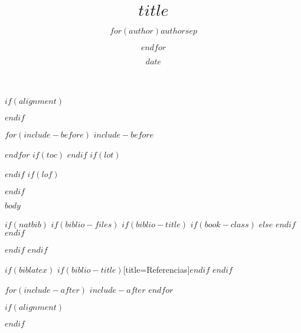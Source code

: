 \documentclass[letterpaper, 12pt, spanish, twoside]{book}
\title{$title$}
\author{$for(author)$$author$$sep$ \and $endfor$}
\date{$date$}
\begin{document}

  $if(alignment)$
  \begin{$alignment$}
  $endif$

  $for(include-before)$
  $include-before$

  $endfor$
  $if(toc)$
  {
  \hypersetup{linkcolor=black}
  \setcounter{tocdepth}{$toc-depth$}
  \tableofcontents
  }
  $endif$
  $if(lot)$
  \listoftables
  $endif$
  $if(lof)$
  \listoffigures
  $endif$

  $body$

  $if(natbib)$
  $if(biblio-files)$
  $if(biblio-title)$
  $if(book-class)$
  \renewcommand\bibname{Bibliography}
  $else$
  \renewcommand\refname{References}
  $endif$
  $endif$
  
  $endif$
  $endif$

  $if(biblatex)$
  \printbibliography$if(biblio-title)$[title=Referencias]$endif$
  $endif$

  $for(include-after)$
  $include-after$
  $endfor$

  $if(alignment)$
  \end{$alignment$}
  $endif$
\end{document}
